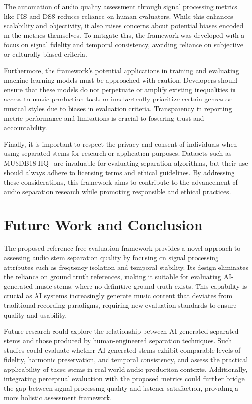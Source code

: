 \documentclass[10pt,twocolumn]{article}
\begin{document}
The automation of audio quality assessment through signal processing metrics like FIS and DSS reduces reliance on human evaluators. While this enhances scalability and objectivity, it also raises concerns about potential biases encoded in the metrics themselves. To mitigate this, the framework was developed with a focus on signal fidelity and temporal consistency, avoiding reliance on subjective or culturally biased criteria.

Furthermore, the framework's potential applications in training and evaluating machine learning models must be approached with caution. Developers should ensure that these models do not perpetuate or amplify existing inequalities in access to music production tools or inadvertently prioritize certain genres or musical styles due to biases in evaluation criteria. Transparency in reporting metric performance and limitations is crucial to fostering trust and accountability.

Finally, it is important to respect the privacy and consent of individuals when using separated stems for research or application purposes. Datasets such as MUSDB18-HQ~\cite{musdb18-hq} are invaluable for evaluating separation algorithms, but their use should always adhere to licensing terms and ethical guidelines. By addressing these considerations, this framework aims to contribute to the advancement of audio separation research while promoting responsible and ethical practices.
\section{Future Work and Conclusion}

The proposed reference-free evaluation framework provides a novel approach to assessing audio stem separation quality by focusing on signal processing attributes such as frequency isolation and temporal stability. Its design eliminates the reliance on ground truth references, making it suitable for evaluating AI-generated music stems, where no definitive ground truth exists. This capability is crucial as AI systems increasingly generate music content that deviates from traditional recording paradigms, requiring new evaluation standards to ensure quality and usability.

Future research could explore the relationship between AI-generated separated stems and those produced by human-engineered separation techniques. Such studies could evaluate whether AI-generated stems exhibit comparable levels of fidelity, harmonic preservation, and temporal consistency, and assess the practical applicability of these stems in real-world audio production contexts. Additionally, integrating perceptual evaluation with the proposed metrics could further bridge the gap between signal processing quality and listener satisfaction, providing a more holistic assessment framework.
\end{document}
